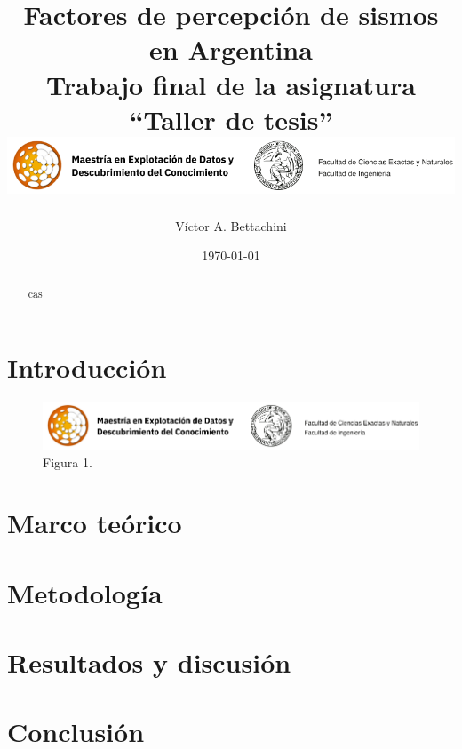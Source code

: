 \documentclass[a4paper]{report}
\begin{document}
\title{
	{Factores de percepción de sismos en Argentina}\\[1 cm]
	{Trabajo final de la asignatura ``Taller de tesis''}
	{\includegraphics[width=\textwidth]{logos}}
}
\author{Víctor A. Bettachini}
\date{\today}
\maketitle

\begin{abstract}
	cas
\end{abstract}

\tableofcontents

\chapter{Introducción}


\begin{figure}
\centering
\includegraphics[width=\textwidth]{logos}
\caption{Figura 1.}
\label{fig:figura1}
\end{figure}


\chapter{Marco teórico}

\chapter{Metodología}

\chapter{Resultados y discusión}

\chapter{Conclusión}

\printbibliography[heading=bibintoc]
\end{document}
